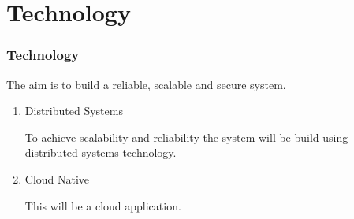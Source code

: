 \section{Technology}
\begin{frame}[allowframebreaks]
    \frametitle{Technology}

    The aim is to build a reliable, scalable and secure system.

    \begin{enumerate}
        \item Distributed Systems

              To achieve scalability and reliability the system will be build using distributed systems technology.

        \item Cloud Native

              This will be a cloud application.
    \end{enumerate}

\end{frame}
